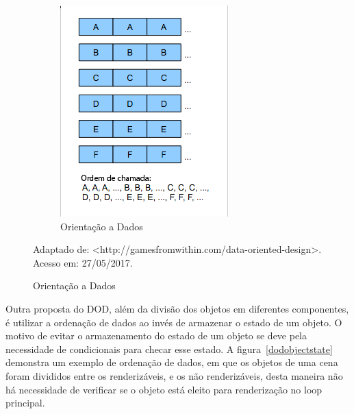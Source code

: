 \begin{figure}[h!]
\begin{subfigure}[b]{0.35\textwidth}
        \includegraphics[width=\textwidth]{../figuras/dodreadingorder}
        \caption{Orientação a Dados}
        \label{fig:dod}
    \end{subfigure}
    \par\medskip
    Adaptado de: <http://gamesfromwithin.com/data-oriented-design>. Acesso em: 27/05/2017.
    \label{oodvsdod}
\end{figure}

\medskip

Outra proposta do DOD, além da divisão dos objetos em diferentes 
componentes, é utilizar a ordenação de dados ao invés de armazenar 
o estado de um objeto. O motivo de evitar o armazenamento do estado 
de um objeto se deve pela necessidade de condicionais para checar 
esse estado. A figura~\ref{dodobjectstate} demonstra um exemplo de 
ordenação de dados, em que os objetos de uma cena foram divididos 
entre os renderizáveis, e os não renderizáveis, desta maneira não há 
necessidade de verificar se o objeto está eleito para renderização 
no loop principal.

